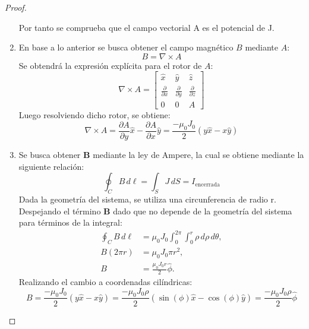 \begin{proof}
\begin{enumerate}
            Por tanto se comprueba que el campo vectorial A es el potencial de J.
        \item En base a lo anterior se busca obtener el campo magnético \(B\) mediante \(A\):
            \begin{equation}
                B = \nabla \times A
            \end{equation}
            Se obtendrá la expresión explícita para el rotor de \(A\):
            \begin{equation}
                \nabla \times A = \begin{bmatrix} \hat{x} & \hat{y} & \hat{z} \\ \frac{\partial}{\partial x} & \frac{\partial}{\partial y} & \frac{\partial}{\partial z} \\ 0 & 0 & A \end{bmatrix}
            \end{equation}
            Luego resolviendo dicho rotor, se obtiene:
            \begin{equation}
                \nabla \times A = \frac{\partial A}{\partial y} \hat{x} - \frac{\partial A}{\partial x} \hat{y} = \frac{-\mu_0 J_0}{2}(y \hat{x} - x \hat{y})
            \end{equation}
        \item Se busca obtener \textbf{B} mediante la ley de Ampere, la cual se obtiene mediante la siguiente relación:
            \begin{equation}
                \oint_C B \, d\ell = \int_S J \, dS = I_{\text{encerrada}}
            \end{equation}
            Dada la geometría del sistema, se utiliza una circunferencia de radio r. Despejando el término \textbf{B} dado que no depende de la geometría del sistema para términos de la integral:
            \begin{align}
                \oint_C B \, d\ell &= \mu_0 J_0 \int_{0}^{2\pi} \int_{0}^{r} \rho \, d\rho \, d\theta, \\
                B (2\pi r) &= \mu_0 J_0 \pi r^2, \\
                B &= \frac{\mu_0 J_0 r}{2} \hat{\phi}.
            \end{align}
            Realizando el cambio a coordenadas cilíndricas:
            \begin{equation}
                B = \frac{-\mu_0 J_0}{2}(y\hat{x} - x\hat{y}) = \frac{-\mu_0 J_0 \rho}{2}(\sin(\phi) \hat{x} - \cos(\phi) \hat{y}) = \frac{-\mu_0 J_0 \rho}{2} \hat{\phi}
            \end{equation}
    \end{enumerate}  
\end{proof}
\newpage

